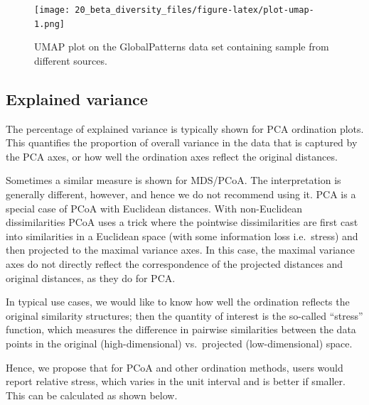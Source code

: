 \documentclass[
]{book}
\begin{document}
\begin{figure}
\centering
\texttt{[image: 20\_beta\_diversity\_files/figure-latex/plot-umap-1.png]}
\caption{\label{fig:plot-umap}UMAP plot on the GlobalPatterns data set containing sample from different sources.}
\end{figure}

\hypertarget{explained-variance}{%
\subsection{Explained variance}\label{explained-variance}}

The percentage of explained variance is typically shown for PCA
ordination plots. This quantifies the proportion of overall variance
in the data that is captured by the PCA axes, or how well the
ordination axes reflect the original distances.

Sometimes a similar measure is shown for MDS/PCoA. The interpretation
is generally different, however, and hence we do not recommend using
it. PCA is a special case of PCoA with Euclidean distances. With
non-Euclidean dissimilarities PCoA uses a trick where the pointwise
dissimilarities are first cast into similarities in a Euclidean space
(with some information loss i.e.~stress) and then projected to the
maximal variance axes. In this case, the maximal variance axes do not
directly reflect the correspondence of the projected distances and
original distances, as they do for PCA.

In typical use cases, we would like to know how well the ordination
reflects the original similarity structures; then the quantity of
interest is the so-called ``stress'' function, which measures the
difference in pairwise similarities between the data points in the
original (high-dimensional) vs.~projected (low-dimensional) space.

Hence, we propose that for PCoA and other ordination methods, users
would report relative stress, which varies in the unit interval and is better
if smaller. This can be calculated as shown below.
\end{document}
